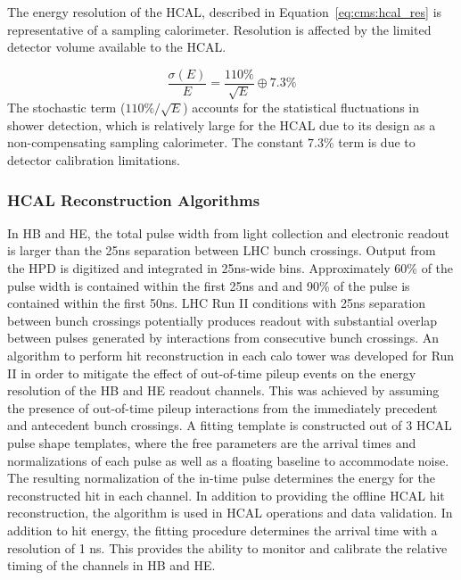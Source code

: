 The energy resolution of the HCAL, described in Equation~\ref{eq:cms:hcal_res} is representative of a sampling calorimeter. Resolution is affected by the limited detector volume available to the HCAL\cite{Cavallari_2011}.

\begin{equation}
\frac{\sigma(E)}{E}=\frac{110\%}{\sqrt{E}} \oplus 7.3\%
\label{eq:cms:hcal_res}
\end{equation}
The stochastic term (${110\%}/\sqrt{E}$) accounts for the statistical fluctuations in shower detection, which is relatively large for the HCAL due to its design as a non-compensating sampling calorimeter. The constant $7.3\%$ term is due to detector calibration limitations.

\subsubsection{HCAL Reconstruction Algorithms}
In HB and HE, the total pulse width from light collection and electronic readout is larger than the 25ns separation between LHC bunch crossings. Output from the HPD is digitized and integrated in 25ns-wide bins. Approximately 60\% of the pulse width is contained within the first 25ns and and 90\% of the pulse is contained within the first 50ns. LHC Run II conditions with 25ns separation between bunch crossings potentially produces readout with substantial overlap between pulses generated by interactions from consecutive bunch crossings. An algorithm to perform hit reconstruction in each calo tower was developed for Run II in order to mitigate the effect of out-of-time pileup events on the energy resolution of the HB and HE readout channels. This was achieved by assuming the presence of out-of-time pileup interactions from the immediately precedent and antecedent bunch crossings. A fitting template is constructed out of 3 HCAL pulse shape templates, where the free parameters are the arrival times and normalizations of each pulse as well as a floating baseline to accommodate noise. The resulting normalization of the in-time pulse determines the energy for the reconstructed hit in each channel. 
In addition to providing the offline HCAL hit reconstruction, the algorithm is used in HCAL operations and data validation. In addition to hit energy, the fitting procedure determines the arrival time with a resolution of 1 ns. This provides the ability to monitor and calibrate the relative timing of the channels in HB and HE. 
